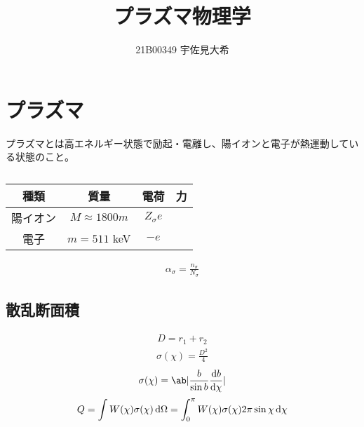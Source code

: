 \documentclass[a4paper,11pt]{jlreq}
\title{プラズマ物理学}
\author{21B00349 宇佐見大希}
\begin{document}
\maketitle
\tableofcontents
\clearpage

\section{プラズマ}
プラズマとは高エネルギー状態で励起・電離し、陽イオンと電子が熱運動している状態のこと。



\begin{table}[h]
  \centering
  \begin{tabular}{|c|ccc|}
    \hline
    種類   & 質量                 & 電荷           & 力 \\
    \hline
    陽イオン & $M \approx 1800m$  & $Z_\sigma e$ &   \\
    電子   & $m = 511$ \si{keV} & $-e$         &   \\
    \hline
  \end{tabular}
  \caption{}
  \label{table:particles}
\end{table}
\begin{align}
  \alpha_\sigma = \frac{n_\sigma}{N_\sigma}
\end{align}

\subsection{散乱断面積}

\begin{align}
  D = r_1 + r_2
\end{align}
\begin{align}
  \sigma(\chi) = \frac{D^2}{4}
\end{align}
\begin{align}
  \sigma(\chi) = \ab|\frac{b}{\sin b}\diff{b}{\chi}|
\end{align}
\begin{align}
  Q = \int W(\chi)\sigma(\chi)\dl{\Omega} = \int_0^\pi W(\chi)\sigma(\chi)2\pi\sin\chi\dl{\chi}
\end{align}
\end{document}
